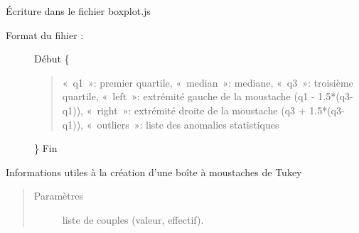 \documentclass[letterpaper,10pt,french]{sphinxmanual}
\begin{document}

\begin{fulllineitems}
\label{\detokenize{addQuantitativesDiscretes:add.addQuantitativesDiscretes.infoBoiteTukey}}
Écriture dans le fichier boxplot.js
\begin{description}
\item[{Format du fihier :}] \leavevmode
Début
\{
\begin{quote}

« q1 »: premier quartile,
« median »: mediane,
« q3 »: troisième quartile,
« left »: extrémité gauche de la moustache (q1 - 1.5*(q3-q1)),
« right »: extrémité droite de la moustache (q3 + 1.5*(q3-q1)),
« outliers »: liste des anomalies statistiques
\end{quote}

\}
Fin

\end{description}

Informations utiles à la création d’une boîte à moustaches de Tukey
\begin{quote}\begin{description}
\item[{Paramètres}] \leavevmode
{} \textendash{} liste de couples (valeur, effectif).

\end{description}\end{quote}

\end{fulllineitems}

\end{document}
